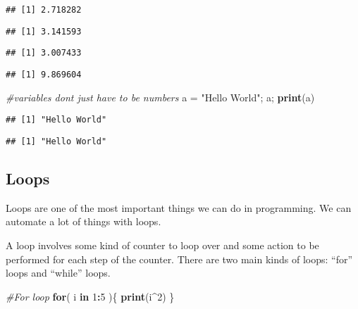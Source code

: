 \documentclass[
]{article}
\newenvironment{Shaded}{\begin{snugshade}}{\end{snugshade}}
\newcommand{\CommentTok}[1]{\textcolor[rgb]{0.56,0.35,0.01}{\textit{#1}}}
\newcommand{\ControlFlowTok}[1]{\textcolor[rgb]{0.13,0.29,0.53}{\textbf{#1}}}
\newcommand{\DecValTok}[1]{\textcolor[rgb]{0.00,0.00,0.81}{#1}}
\newcommand{\FunctionTok}[1]{\textcolor[rgb]{0.13,0.29,0.53}{\textbf{#1}}}
\newcommand{\NormalTok}[1]{#1}
\newcommand{\OtherTok}[1]{\textcolor[rgb]{0.56,0.35,0.01}{#1}}
\newcommand{\SpecialCharTok}[1]{\textcolor[rgb]{0.81,0.36,0.00}{\textbf{#1}}}
\newcommand{\StringTok}[1]{\textcolor[rgb]{0.31,0.60,0.02}{#1}}
\begin{document}
\begin{verbatim}
## [1] 2.718282
\end{verbatim}

\begin{verbatim}
## [1] 3.141593
\end{verbatim}

\begin{verbatim}
## [1] 3.007433
\end{verbatim}

\begin{verbatim}
## [1] 9.869604
\end{verbatim}

\begin{Shaded}
\begin{Highlighting}[]
\CommentTok{\#variables don\textquotesingle{}t just have to be numbers}
\NormalTok{a }\OtherTok{=} \StringTok{"Hello World"}\NormalTok{; a; }\FunctionTok{print}\NormalTok{(a)}
\end{Highlighting}
\end{Shaded}

\begin{verbatim}
## [1] "Hello World"
\end{verbatim}

\begin{verbatim}
## [1] "Hello World"
\end{verbatim}

\hypertarget{loops}{%
\subsection{Loops}\label{loops}}

Loops are one of the most important things we can do in programming. We
can automate a lot of things with loops.

A loop involves some kind of counter to loop over and some action to be
performed for each step of the counter. There are two main kinds of
loops: ``for'' loops and ``while'' loops.

\begin{Shaded}
\begin{Highlighting}[]
\CommentTok{\#For loop}
\ControlFlowTok{for}\NormalTok{( i }\ControlFlowTok{in} \DecValTok{1}\SpecialCharTok{:}\DecValTok{5}\NormalTok{ )\{}
  \FunctionTok{print}\NormalTok{(i}\SpecialCharTok{\^{}}\DecValTok{2}\NormalTok{)}
\NormalTok{\}}
\end{Highlighting}
\end{Shaded}
\end{document}

